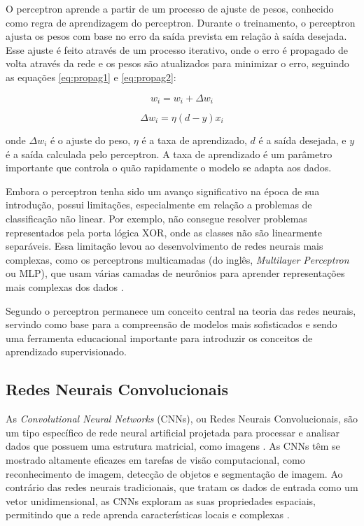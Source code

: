 O perceptron aprende a partir de um processo de ajuste de pesos, conhecido como regra de aprendizagem do perceptron. Durante o treinamento, o perceptron ajusta os pesos com base no erro da saída prevista em relação à saída desejada. Esse ajuste é feito através de um processo iterativo, onde o erro é propagado de volta através da rede e os pesos são atualizados para minimizar o erro, seguindo as equações \ref{eq:propag1} e \ref{eq:propag2}:

\begin{equation}
    w_i = w_i + \Delta w_i
    \label{eq:propag1}
\end{equation}

\begin{equation}
    \Delta w_i = \eta (d - y) x_i
    \label{eq:propag2}
\end{equation}

onde \( \Delta w_i \) é o ajuste do peso, \( \eta \) é a taxa de aprendizado, \( d \) é a saída desejada, e \( y \) é a saída calculada pelo perceptron. A taxa de aprendizado é um parâmetro importante que controla o quão rapidamente o modelo se adapta aos dados.

Embora o perceptron tenha sido um avanço significativo na época de sua introdução, possui limitações, especialmente em relação a problemas de classificação não linear. Por exemplo, não consegue resolver problemas representados pela porta lógica XOR, onde as classes não são linearmente separáveis. Essa limitação levou ao desenvolvimento de redes neurais mais complexas, como os perceptrons multicamadas (do inglês, \textit{Multilayer Perceptron} ou MLP), que usam várias camadas de neurônios para aprender representações mais complexas dos dados \cite{bishop2006pattern}. %

Segundo  o perceptron permanece um conceito central na teoria das redes neurais, servindo como base para a compreensão de modelos mais sofisticados e sendo uma ferramenta educacional importante para introduzir os conceitos de aprendizado supervisionado.


\subsection{Redes Neurais Convolucionais}

As \textit{Convolutional Neural Networks} (CNNs), ou Redes Neurais Convolucionais, são um tipo específico de rede neural artificial projetada para processar e analisar dados que possuem uma estrutura matricial, como imagens \cite{o2015introduction}. As CNNs têm se mostrado altamente eficazes em tarefas de visão computacional, como reconhecimento de imagem, detecção de objetos e segmentação de imagem. Ao contrário das redes neurais tradicionais, que tratam os dados de entrada como um vetor unidimensional, as CNNs exploram as suas propriedades espaciais, permitindo que a rede aprenda características locais e complexas \cite{nielsen2015neural}.

